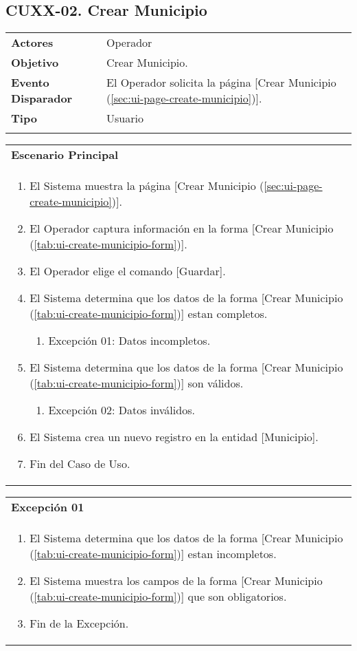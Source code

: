 \clearpage
\subsection{CUXX-02. Crear Municipio} \label{sec:cu-create-Municipio}

\begin{tabular}{ p{3.5cm} p{11.5cm} }
	\textbf{Actores} & Operador\\
	\textbf{Objetivo} & Crear Municipio.\\
	\textbf{Evento Disparador} & El Operador solicita la página [Crear Municipio (\ref{sec:ui-page-create-municipio})].\\
	\textbf{Tipo} & Usuario\\
	\\
\end{tabular}

\begin{tabular}{ p{15.5cm} }
	\textbf{Escenario Principal} \\
	\begin{enumerate}
		\item El Sistema muestra la página [Crear Municipio (\ref{sec:ui-page-create-municipio})].
		\item El Operador captura información en la forma [Crear Municipio (\ref{tab:ui-create-municipio-form})].
		\item El Operador elige el comando [Guardar].
		\item El Sistema determina que los datos de la forma [Crear Municipio (\ref{tab:ui-create-municipio-form})] estan completos.
			\begin{enumerate}
				\item Excepción 01: Datos incompletos.
			\end{enumerate}
		\item El Sistema determina que los datos de la forma [Crear Municipio (\ref{tab:ui-create-municipio-form})] son válidos.
			\begin{enumerate}
				\item Excepción 02: Datos inválidos.
			\end{enumerate}
		\item El Sistema crea un nuevo registro en la entidad [Municipio].
		\item Fin del Caso de Uso.
	\end{enumerate}
\end{tabular}

\begin{tabular}{ p{15.5cm} }
	\textbf{Excepción 01} \\
	\begin{enumerate}
		\item El Sistema determina que los datos de la forma [Crear Municipio (\ref{tab:ui-create-municipio-form})] estan incompletos.
		\item El Sistema muestra los campos de la forma [Crear Municipio (\ref{tab:ui-create-municipio-form})] que son obligatorios.
		\item Fin de la Excepción.
	\end{enumerate}
\end{tabular}


